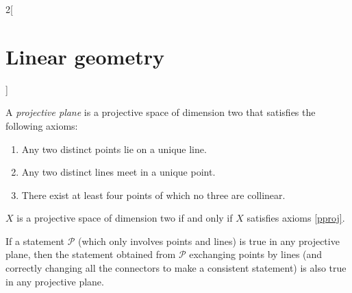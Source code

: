 \documentclass[class=article,10pt,crop=false]{standalone}
\begin{document}
\begin{multicols}{2}[\section{Linear geometry}]
\begin{definition}
\label{pproj}
A \textit{projective plane} is a projective space of dimension two that satisfies the following axioms:
\begin{enumerate}
    \item Any two distinct points lie on a unique line.
    \item Any two distinct lines meet in a unique point.
    \item There exist at least four points of which no three are collinear.
\end{enumerate}
\end{definition}
\begin{theorem}
$X$ is a projective space of dimension two if and only if $X$ satisfies axioms \ref{pproj}.
\end{theorem}
\begin{theorem}
If a statement $\mathcal{P}$ (which only involves points and lines) is true in any projective plane, then the statement obtained from $\mathcal{P}$ exchanging points by lines (and correctly changing all the connectors to make a consistent statement) is also true in any projective plane.
\end{theorem}

\end{multicols}
\end{document}
